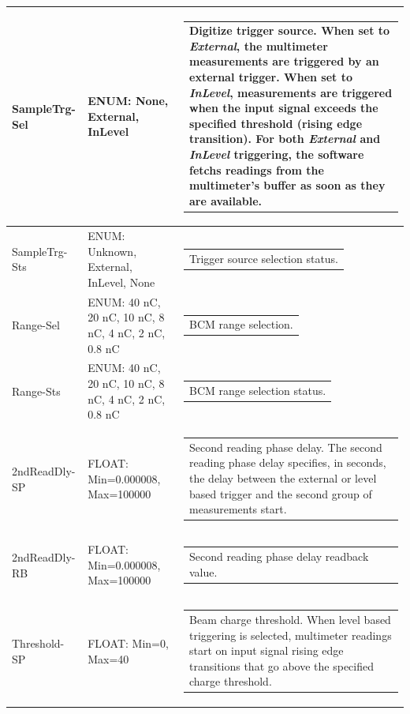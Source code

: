 \documentclass[openany]{article}
\begin{document}
\begin{longtable}{| m{3.0cm} m{4.5cm} m{7.0cm} |}
		SampleTrg-Sel & ENUM: None, External, InLevel & \begin{tabular}{@{}m{6cm}@{}}
				      	  Digitize trigger source. When set to \emph{External}, the multimeter measurements are triggered by an external trigger. When set to \emph{InLevel}, measurements are triggered when the input signal exceeds the specified threshold (rising edge transition). For both \emph{External} and \emph{InLevel} triggering, the software fetchs $ 2 \times count $ readings from the multimeter's buffer as soon as they are available.
					  \end{tabular} \\ \hline
		SampleTrg-Sts & ENUM: Unknown, External, InLevel, None & \begin{tabular}{@{}m{6cm}@{}}
	    					Trigger source selection status.
						\end{tabular} \\ \hline
		Range-Sel & ENUM: 40 nC, 20 nC, 10 nC, 8 nC, 4 nC, 2 nC, 0.8 nC & \begin{tabular}{@{}m{6cm}@{}}
	    					BCM range selection.
						\end{tabular} \\ \hline
		Range-Sts & ENUM: 40 nC, 20 nC, 10 nC, 8 nC, 4 nC, 2 nC, 0.8 nC & \begin{tabular}{@{}m{6cm}@{}}
	    					BCM range selection status.
						\end{tabular} \\ \hline
		2ndReadDly-SP & FLOAT: Min=0.000008, Max=100000 & \begin{tabular}{@{}m{6cm}@{}}
	    					Second reading phase delay. The second reading phase delay specifies, in seconds, the delay between the external or level based trigger and the second group of measurements start.
						\end{tabular} \\ \hline
		2ndReadDly-RB & FLOAT: Min=0.000008, Max=100000 & \begin{tabular}{@{}m{6cm}@{}}
	    					Second reading phase delay readback value.
						\end{tabular} \\ \hline
		Threshold-SP & FLOAT: Min=0, Max=40 & \begin{tabular}{@{}m{6cm}@{}}
	    					Beam charge threshold. When level based triggering is selected, multimeter readings start on input signal rising edge transitions that go above the specified charge threshold.

\end{tabular}
\end{longtable}
\end{document}
